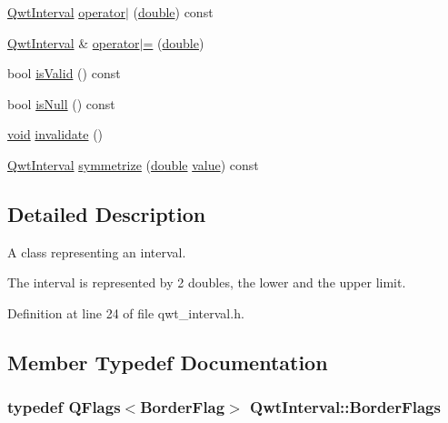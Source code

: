 \begin{DoxyCompactItemize}
\item 
\hyperlink{class_qwt_interval}{Qwt\-Interval} \hyperlink{class_qwt_interval_ae0671b0b9422d5da3a103cbd7c938484}{operator$|$} (\hyperlink{_super_l_u_support_8h_a8956b2b9f49bf918deed98379d159ca7}{double}) const 
\item 
\hyperlink{class_qwt_interval}{Qwt\-Interval} \& \hyperlink{class_qwt_interval_a86a2785d0fc6860e15cfc277c14e7a09}{operator$|$=} (\hyperlink{_super_l_u_support_8h_a8956b2b9f49bf918deed98379d159ca7}{double})
\item 
bool \hyperlink{class_qwt_interval_af7ddb2347a4b5ed2205f84372e41c99e}{is\-Valid} () const 
\item 
bool \hyperlink{class_qwt_interval_ac5e85b71e18fa43c92984e08c4549830}{is\-Null} () const 
\item 
\hyperlink{group___u_a_v_objects_plugin_ga444cf2ff3f0ecbe028adce838d373f5c}{void} \hyperlink{class_qwt_interval_a66c1d4ed7836dfbf3c6e851479ff32cf}{invalidate} ()
\item 
\hyperlink{class_qwt_interval}{Qwt\-Interval} \hyperlink{class_qwt_interval_a86dae3b22782b8548fd4e2c625bf1830}{symmetrize} (\hyperlink{_super_l_u_support_8h_a8956b2b9f49bf918deed98379d159ca7}{double} \hyperlink{glext_8h_aa0e2e9cea7f208d28acda0480144beb0}{value}) const 
\end{DoxyCompactItemize}


\subsection{Detailed Description}
A class representing an interval. 

The interval is represented by 2 doubles, the lower and the upper limit. 

Definition at line 24 of file qwt\-\_\-interval.\-h.



\subsection{Member Typedef Documentation}
\hypertarget{class_qwt_interval_a678a26fcaa91cca596d9aebcbf5776c9}{
\subsubsection[{Border\-Flags}]{\setlength{\rightskip}{0pt plus 5cm}typedef Q\-Flags$<${\bf Border\-Flag}$>$ {\bf Qwt\-Interval\-::\-Border\-Flags}}}\label{class_qwt_interval_a678a26fcaa91cca596d9aebcbf5776c9}


